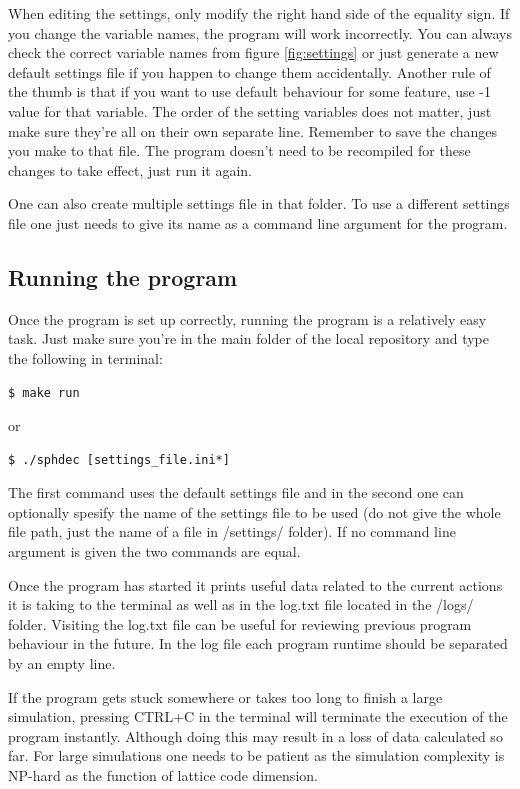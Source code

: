 \documentclass[english,12pt,a4paper,pdftex,sci,utf8]{aaltothesis}
\begin{document}
When editing the settings, only modify the right hand side of the equality sign. If you change the variable names, the program will work incorrectly. You can always check the correct variable names from figure \ref{fig:settings} or just generate a new default settings file if you happen to change them accidentally. Another rule of the thumb is that if you want to use default behaviour for some feature, use -1 value for that variable. The order of the setting variables does not matter, just make sure they're all on their own separate line. Remember to save the changes you make to that file. The program doesn't need to be recompiled for these changes to take effect, just run it again. 
\par One can also create multiple settings file in that folder. To use a different settings file one just needs to give its name as a command line argument for the program.

\subsection{Running the program}

Once the program is set up correctly, running the program is a relatively easy task. Just make sure you're in the main folder of the local repository and type the following in terminal:
\begin{verbatim}
$ make run
\end{verbatim}
or
\begin{verbatim}
$ ./sphdec [settings_file.ini*]
\end{verbatim}

\noindent The first command uses the default settings file and in the second one can optionally spesify the name of the settings file to be used (do not give the whole file path, just the name of a file in /settings/ folder). If no command line argument is given the two commands are equal.
\par Once the program has started it prints useful data related to the current actions it is taking to the terminal as well as in the log.txt file located in the /logs/ folder. Visiting the log.txt file can be useful for reviewing previous program behaviour in the future. In the log file each program runtime should be separated by an empty line.
\par If the program gets stuck somewhere or takes too long to finish a large simulation, pressing CTRL+C in the terminal will terminate the execution of the program instantly. Although doing this may result in a loss of data calculated so far. For large simulations one needs to be patient as the simulation complexity is NP-hard as the function of lattice code dimension.
\end{document}

